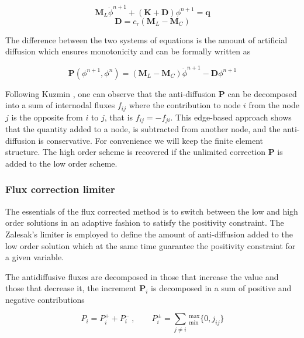\begin{equation} \label{lo}
\mathbf{M}_L\dot{\phi}^{n+1} + \left(\mathbf{K+D}\right)\phi^{n+1} = \mathbf{q}
\end{equation}
\begin{equation} \label{scalar_diffusion}
\mathbf{D} = c_\tau\left(\mathbf{M}_L - \mathbf{M}_C\right)
\end{equation}

The difference between the two systems of equations is the amount of artificial diffusion which ensures monotonicity and can be formally written as

\begin{equation}
\mathbf{P}(\phi^{n+1}, \phi^n) = (\mathbf{M}_L - \mathbf{M}_C)\dot{\phi}^{n+1} - \mathbf{D} \phi^{n+1}
\end{equation}

Following Kuzmin \cite{kuzmin2005a}, one can observe that the anti-diffusion $\mathbf{P}$ can be decomposed into a sum of internodal fluxes $f_{ij}$ where the contribution to node $i$ from the node $j$ is the opposite from $i$ to $j$, that is $f_{ij}=-f_{ji}$. This edge-based approach shows that the quantity added to a node, is subtracted from another node, and the anti-diffusion is conservative. For convenience we will keep the finite element structure. The high order scheme is recovered if the unlimited correction $\mathbf{P}$ is added to the low order scheme.



\subsubsection{Flux correction limiter}

The essentials of the flux corrected method is to switch between the low and high order solutions in an adaptive fashion to satisfy the positivity constraint. The Zalesak's limiter is employed to define the amount of anti-diffusion added to the low order solution which at the same time guarantee the positivity constraint for a given variable.

The antidiffusive fluxes are decomposed in those that increase the value and those that decrease it, the increment $\mathbf{P}_i$ is decomposed in a sum of positive and negative contributions

\begin{equation}
P_i = P_i^+ + P_i^- \ , \qquad
P_i^{\pm} = \sum_{j\neq i} \,
_{\min}^{\max} \{0, j_{ij}\}
\end{equation}

